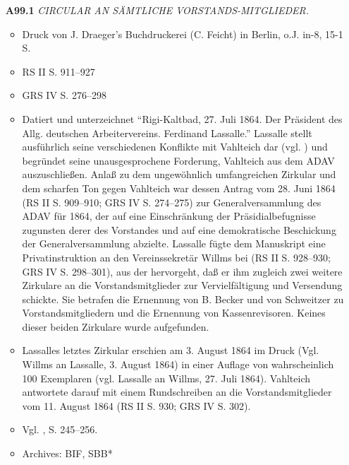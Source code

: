 \begin{itemize}
    \item[\textbf{A99.1}] \textit{CIRCULAR AN SÄMTLICHE VORSTANDS-MITGLIEDER.}
    \begin{itemize}
        \item Druck von J. Draeger's Buchdruckerei (C. Feicht) in Berlin, o.J. in-8, 15-1 S. 
        \item RS II S. 911--927
        \item GRS IV S. 276--298
        \item Datiert und unterzeichnet ``Rigi-Kaltbad, 27. Juli 1864. Der Präsident des Allg. deutschen Arbeitervereins. Ferdinand Lassalle.'' Lassalle stellt ausführlich seine verschiedenen Konflikte mit Vahlteich dar (vgl. ) und begründet seine unausgesprochene Forderung, Vahlteich aus dem ADAV auszuschließen. Anlaß zu dem ungewöhnlich umfangreichen Zirkular und dem scharfen Ton gegen Vahlteich war dessen Antrag vom 28. Juni 1864 (RS II S. 909--910; GRS IV S. 274--275) zur Generalversammlung des ADAV für 1864, der auf eine Einschränkung der Präsidialbefugnisse zugunsten derer des Vorstandes und auf eine demokratische Beschickung der Generalversammlung abzielte. Lassalle fügte dem Manuskript eine Privatinstruktion an den Vereinssekretär Willms bei (RS II S. 928--930; GRS IV S. 298--301), aus der hervorgeht, daß er ihm zugleich zwei weitere Zirkulare an die Vorstandsmitglieder zur Vervielfältigung und Versendung schickte. Sie betrafen die Ernennung von B. Becker und von Schweitzer zu Vorstandsmitgliedern und die Ernennung von Kassenrevisoren. Keines dieser beiden Zirkulare wurde aufgefunden.
        \item Lassalles letztes Zirkular erschien am 3. August 1864 im Druck (Vgl. Willms an Lassalle, 3. August 1864) in einer Auflage von wahrscheinlich 100 Exemplaren (vgl. Lassalle an Willms, 27. Juli 1864). Vahlteich antwortete darauf mit einem Rundschreiben an die Vorstandsmitglieder vom 11. August 1864 (RS II S. 930; GRS IV S. 302).
        \item Vgl. , S. 245--256.
        \item Archives: BIF, SBB*
    \end{itemize}
    

\end{itemize}
